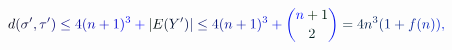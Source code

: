 \documentclass[12pt]{article}
\begin{document}
\makeatletter
\renewcommand*{\@textcolor}[3]{%
  \protect\leavevmode
  \begingroup
    \color#1{#2}#3%
  \endgroup
}
\makeatother
\begin{displaymath}
\mathcolor[RGB]{0,0,15}{d} \mathcolor[RGB]{0,0,30}{(} \mathcolor[RGB]{0,0,45}{\sigma} ^ { \mathcolor[RGB]{0,0,60}{\prime} } \mathcolor[RGB]{0,0,75}{,} \mathcolor[RGB]{0,0,90}{\tau} ^ { \mathcolor[RGB]{0,0,105}{\prime} } \mathcolor[RGB]{0,0,120}{)} \mathcolor[RGB]{0,0,135}{\leq} \mathcolor[RGB]{0,0,150}{4} \mathcolor[RGB]{0,0,165}{(} \mathcolor[RGB]{0,0,180}{n} \mathcolor[RGB]{0,0,195}{+} \mathcolor[RGB]{0,0,210}{1} \mathcolor[RGB]{0,0,225}{)} ^ { \mathcolor[RGB]{0,0,240}{3} } \mathcolor[RGB]{0,0,255}{+} \mathcolor[RGB]{0,15,0}{|} \mathcolor[RGB]{0,15,15}{E} \mathcolor[RGB]{0,15,30}{(} \mathcolor[RGB]{0,15,45}{Y} ^ { \mathcolor[RGB]{0,15,60}{\prime} } \mathcolor[RGB]{0,15,75}{)} \mathcolor[RGB]{0,15,90}{|} \mathcolor[RGB]{0,15,105}{\leq} \mathcolor[RGB]{0,15,120}{4} \mathcolor[RGB]{0,15,135}{(} \mathcolor[RGB]{0,15,150}{n} \mathcolor[RGB]{0,15,165}{+} \mathcolor[RGB]{0,15,180}{1} \mathcolor[RGB]{0,15,195}{)} ^ { \mathcolor[RGB]{0,15,210}{3} } \mathcolor[RGB]{0,15,225}{+} \mathcolor[RGB]{0,15,240}{\binom { \mathcolor[RGB]{0,15,255}{n} \mathcolor[RGB]{0,30,0}{+} \mathcolor[RGB]{0,30,15}{1} } { \mathcolor[RGB]{0,30,30}{2} } } \mathcolor[RGB]{0,30,45}{=} \mathcolor[RGB]{0,30,60}{4} \mathcolor[RGB]{0,30,75}{n} ^ { \mathcolor[RGB]{0,30,90}{3} } \mathcolor[RGB]{0,30,105}{(} \mathcolor[RGB]{0,30,120}{1} \mathcolor[RGB]{0,30,135}{+} \mathcolor[RGB]{0,30,150}{f} \mathcolor[RGB]{0,30,165}{(} \mathcolor[RGB]{0,30,180}{n} \mathcolor[RGB]{0,30,195}{)} \mathcolor[RGB]{0,30,210}{)} \mathcolor[RGB]{0,30,225}{,}
\end{displaymath}
\end{document}
